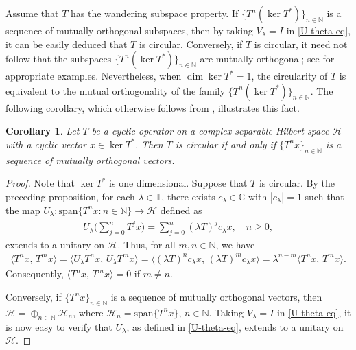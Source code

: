 \documentclass[10pt,a4paper]{amsart}
\newtheorem{corollary}[theorem]{Corollary}%
\newtheorem{remark}[theorem]{Remark}%
\newtheorem{example}[theorem]{Example}
\newcommand{\beqn}{\begin{eqnarray*}}
\newcommand{\eeqn}{\end{eqnarray*}}
\newcommand{\rar}{\rightarrow}
\newcommand{\inp}[2]{\langle{#1},\,{#2} \rangle}
\begin{document}
Assume that $T$ has the wandering subspace property. If $\{T^n(\ker T^*)\}_{n \in \mathbb N}$ is a sequence of mutually orthogonal subspaces, then by taking $V_\lambda = I$ in \eqref{U-theta-eq}, it can be easily deduced that $T$ is circular. Conversely, if $T$ is circular, it need not follow that the subspaces $\{T^n(\ker T^*)\}_{n \in \mathbb N}$ are mutually orthogonal; see \cite{CT} for appropriate examples. Nevertheless, when $\dim\ker T^*=1$, the circularity of $T$ is equivalent to the mutual orthogonality of the family $\{T^n(\ker T^*)\}_{n \in \mathbb N}$. The following corollary, which otherwise follows from \cite[Theorem 2.5]{CY}, illustrates this fact. 

\begin{corollary}\label{cyclic-circular}
Let $T$ be a cyclic operator on a complex separable Hilbert space $\mathcal H$ with a cyclic vector $x \in \ker T^*$. Then $T$ is circular if and only if $\{T^n x\}_{n \in \mathbb N}$ is a sequence of mutually orthogonal vectors.
\end{corollary}

\begin{proof}
Note that $\ker T^*$ is one dimensional. Suppose that $T$ is circular. By the preceding proposition, for each $\lambda \in \mathbb T$, there exists $c_\lambda \in \mathbb C$ with $|c_\lambda| = 1$ such that the map $U_\lambda : \mathrm{span}\{T^n x : n \in \mathbb N\} \rar \mathcal H$ defined as
\beqn
U_\lambda \Big(\sum_{j=0}^n T^j x \Big) = \sum_{j=0}^n (\lambda T)^j c_\lambda x,  \quad n \geqslant 0,
\eeqn
extends to a unitary on $\mathcal H$. Thus, for all $m, n \in \mathbb N$, we have
\beqn
\inp{T^n x}{T^m x} = \inp{U_\lambda T^n x}{U_\lambda T^m x} = \inp{(\lambda T)^n c_\lambda x}{(\lambda T)^m c_\lambda x}= \lambda^{n-m}\inp{T^n x}{T^m x}.
\eeqn 
Consequently, $\inp{T^n x}{T^m x} = 0$ if $m \neq n$.

Conversely, if $\{T^n x\}_{n \in \mathbb N}$ is a sequence of mutually orthogonal vectors, then $\mathcal H = \oplus_{n \in \mathbb N} \mathcal H_n$, where $\mathcal H_n = \text{span}\{T^n x\}$, $n \in \mathbb N$. Taking $V_\lambda = I$ in \eqref{U-theta-eq}, it is now easy to verify that $U_\lambda$, as defined in \eqref{U-theta-eq}, extends to a unitary on $\mathcal H$. 
\end{proof}

%
%
\end{document}
